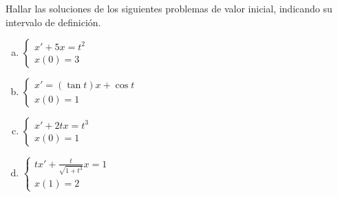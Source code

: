 \documentclass[../main.tex]{subfiles}
\begin{document}
\begin{problem}
	Hallar las soluciones de los siguientes problemas de valor inicial,
	indicando su intervalo de definición.
	\begin{multicols}{2}
	\begin{enumerate}[a)]
		\item \(\displaystyle
				\begin{cases}
					x' + 5x = t^2 \\
					x(0) = 3
				\end{cases}\)

		\item \(\displaystyle
				\begin{cases}
					x' = (\tan t)x + \cos t \\
					x(0) = 1
				\end{cases}\)

		\item \(\displaystyle
				\begin{cases}
					x' + 2tx = t^3 \\
					x(0) = 1
				\end{cases}\)

		\item \(\displaystyle
				\begin{cases}
					tx' + \frac{t}{\sqrt{1 + t^3}}x = 1 \\
					x(1) = 2
				\end{cases}\)
	\end{enumerate}
	\end{multicols}
\end{problem}
\end{document}
